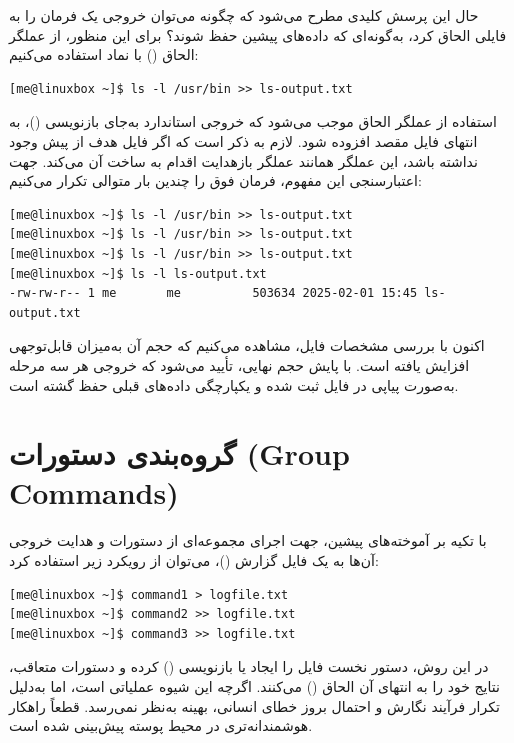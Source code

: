حال این پرسش کلیدی مطرح می‌شود که چگونه می‌توان خروجی یک فرمان را به فایلی الحاق کرد، به‌گونه‌ای که داده‌های پیشین حفظ شوند؟ برای این منظور، از عملگر الحاق () با نماد \cmd{>>} استفاده می‌کنیم:

\begin{latin}
\begin{lstlisting}
[me@linuxbox ~]$ ls -l /usr/bin >> ls-output.txt
\end{lstlisting}
\end{latin}

استفاده از عملگر الحاق \cmd{>>} موجب می‌شود که خروجی استاندارد به‌جای بازنویسی ()، به انتهای فایل مقصد افزوده شود. لازم به ذکر است که اگر فایل هدف از پیش وجود نداشته باشد، این عملگر همانند عملگر بازهدایت \cmd{>} اقدام به ساخت آن می‌کند. جهت اعتبارسنجی این مفهوم، فرمان فوق را چندین بار متوالی تکرار می‌کنیم:

\begin{latin}
\begin{lstlisting}
[me@linuxbox ~]$ ls -l /usr/bin >> ls-output.txt
[me@linuxbox ~]$ ls -l /usr/bin >> ls-output.txt
[me@linuxbox ~]$ ls -l /usr/bin >> ls-output.txt
[me@linuxbox ~]$ ls -l ls-output.txt
-rw-rw-r-- 1 me       me          503634 2025-02-01 15:45 ls-output.txt
\end{lstlisting}
\end{latin}

اکنون با بررسی مشخصات فایل، مشاهده می‌کنیم که حجم آن به‌میزان قابل‌توجهی افزایش یافته است. با پایش حجم نهایی، تأیید می‌شود که خروجی هر سه مرحله به‌صورت پیاپی در فایل ثبت شده و یکپارچگی داده‌های قبلی حفظ گشته است.

\section{گروه‌بندی دستورات (Group Commands)}

با تکیه بر آموخته‌های پیشین، جهت اجرای مجموعه‌ای از دستورات و هدایت خروجی آن‌ها به یک فایل گزارش ()، می‌توان از رویکرد زیر استفاده کرد:

\begin{latin}
\begin{lstlisting}
[me@linuxbox ~]$ command1 > logfile.txt
[me@linuxbox ~]$ command2 >> logfile.txt
[me@linuxbox ~]$ command3 >> logfile.txt
\end{lstlisting}
\end{latin}

در این روش، دستور نخست فایل  را ایجاد یا بازنویسی () کرده و دستورات متعاقب، نتایج خود را به انتهای آن الحاق () می‌کنند. اگرچه این شیوه عملیاتی است، اما به‌دلیل تکرار فرآیند نگارش و احتمال بروز خطای انسانی، بهینه به‌نظر نمی‌رسد. قطعاً راهکار هوشمندانه‌تری در محیط پوسته پیش‌بینی شده است.

